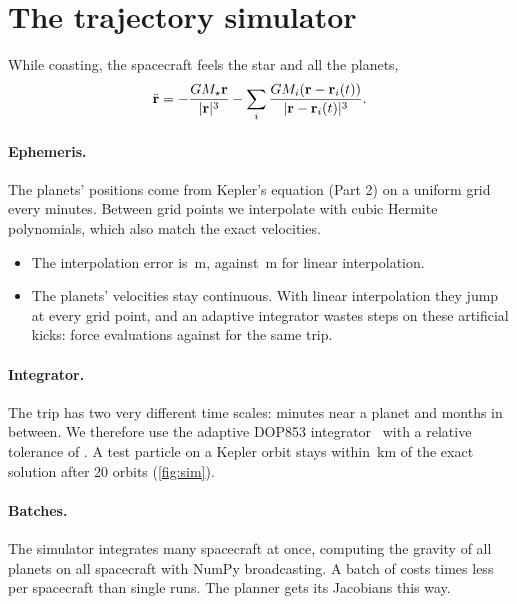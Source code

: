 \documentclass[aps,prd,twocolumn,nofootinbib,floatfix,superscriptaddress]{revtex4-2}
\begin{document}
\section{The trajectory simulator}\label{sec:sim}
While coasting, the spacecraft feels the star and all the planets,
\begin{equation}
  \ddot{\mathbf{r}} = -\frac{GM_\star\mathbf{r}}{|\mathbf{r}|^3}-\sum_i\frac{GM_i(\mathbf{r}-\mathbf{r}_i(t))}{|\mathbf{r}-\mathbf{r}_i(t)|^3}.
\end{equation}

\paragraph{Ephemeris.}
The planets' positions come from Kepler's equation (Part 2) on a uniform grid every  minutes.
Between grid points we interpolate with cubic Hermite polynomials, which also match the exact velocities.
\begin{itemize}
\item The interpolation error is \,m, against \,m for linear interpolation.
\item The planets' velocities stay continuous. With linear interpolation they jump at every grid point, and an adaptive integrator wastes steps on these artificial kicks:  force evaluations against  for the same trip.
\end{itemize}

\paragraph{Integrator.}
The trip has two very different time scales: minutes near a planet and months in between.
We therefore use the adaptive DOP853 integrator~\cite{dormand1980} with a relative tolerance of .
A test particle on a Kepler orbit stays within \,km of the exact solution after 20 orbits (\cref{fig:sim}).

\paragraph{Batches.}
The simulator integrates many spacecraft at once, computing the gravity of all planets on all spacecraft with NumPy broadcasting.
A batch of  costs  times less per spacecraft than single runs.
The planner gets its Jacobians this way.
\end{document}
